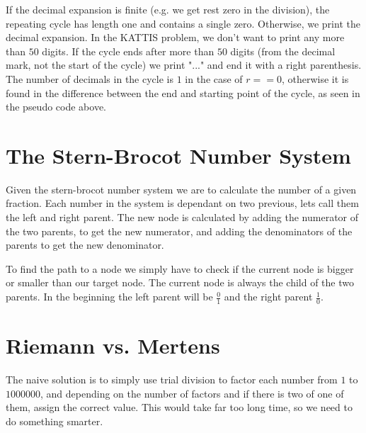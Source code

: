 \documentclass[11pt,a4paper,twoside]{article}
\begin{document}
If the decimal expansion is finite (e.g. we get rest zero in the division), the
repeating cycle has length one and contains a single zero. Otherwise, we print
the decimal expansion. In the KATTIS problem, we don't want to print any more
than $50$ digits. If the cycle ends after more than $50$ digits (from the
decimal mark, not the start of the cycle) we print "..." and end it with a
right parenthesis. The number of decimals in the cycle is $1$ in the case of
$r==0$, otherwise it is found in the difference between the end and starting
point of the cycle, as seen in the pseudo code above.

\section{The Stern-Brocot Number System}

Given the stern-brocot number system we are to calculate the number of a given
fraction. Each number in the system is dependant on two previous, lets call
them the left and right parent. The new node is calculated by adding the
numerator of the two parents, to get the new numerator, and adding the
denominators of the parents to get the new denominator.


To find the path to a node we simply have to check if the current node is
bigger or smaller than our target node. The current node is always the child of
the two parents. In the beginning the left parent will be $\frac{0}{1}$ and the
right parent $\frac{1}{0}$.


\section{Riemann vs. Mertens}

The naive solution is to simply use trial division to factor each number from
$1$ to $1000000$, and depending on the number of factors and if there is two of
one of them, assign the correct value. This would take far too long time, so we
need to do something smarter.
\end{document}
